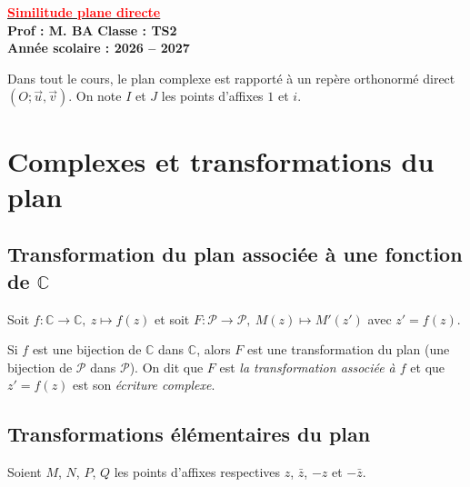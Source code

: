 \documentclass[12pt,a4paper]{article}
\newcommand{\C}{\mathbb{C}}
\begin{document}
\begin{center}
  {\Large\bfseries\underline{\textcolor{red}{Similitude plane directe}}}\\[0.3em]
  \textbf{Prof : M. BA} \hfill \textbf{Classe : TS2} \\
  \textbf{Année scolaire : 2026 -- 2027}
\end{center}

Dans tout le cours, le plan complexe est rapporté à un repère orthonormé direct $(O;\vec u,\vec v)$.
On note $I$ et $J$ les points d'affixes $1$ et $i$.

\section{Complexes et transformations du plan}

\subsection{Transformation du plan associée à une fonction de $\C$}

Soit $f:\C\to\C,\ z\mapsto f(z)$ et soit $F:\mathcal P\to\mathcal P,\ M(z)\mapsto M'(z')$ avec $z'=f(z)$.

\begin{prop}[Propriété]
Si $f$ est une bijection de $\C$ dans $\C$, alors $F$ est une transformation du plan (une bijection de $\mathcal P$ dans $\mathcal P$).
On dit que $F$ est \emph{la transformation associée à $f$} et que $z'=f(z)$ est son \emph{écriture complexe}.
\end{prop}

\subsection{Transformations élémentaires du plan}

Soient $M$, $N$, $P$, $Q$ les points d'affixes respectives $z$, $\bar z$, $-z$ et $-\bar z$.
\end{document}
